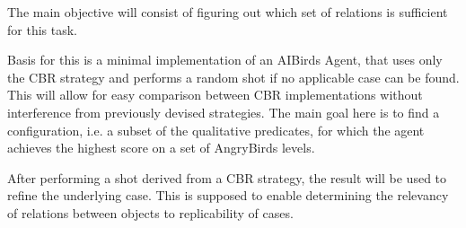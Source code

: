 The main objective will consist of figuring out which set of relations is sufficient for this task.

Basis for this is a minimal implementation of an AIBirds Agent, that uses only the CBR strategy and performs a random
shot if no applicable case can be found.
This will allow for easy comparison between CBR implementations without interference from previously devised strategies.
The main goal here is to find a configuration, i.e. a subset of the qualitative predicates, for which the agent achieves the highest score on a set of AngryBirds levels.

After performing a shot derived from a CBR strategy, the result will be used to refine the underlying case.
This is supposed to enable determining the relevancy of relations between objects to replicability of cases.